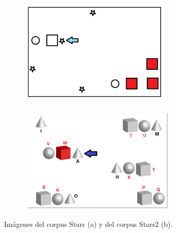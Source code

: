 \begin{figure}[!ht]
\begin{subfigure}{.5\textwidth}

\centering
\includegraphics[width=\textwidth]{images/STARS.png}\\[0pt]
\caption{}
\label{fig-STARS}
\end{subfigure}
\hspace*{0cm}
\begin{subfigure}{.5\textwidth}

\centering
\includegraphics[width=\textwidth]{images/STARS2.png}\\[0pt]
\caption{}
\label{fig-STARS2}
\end{subfigure}
\caption{Im\'agenes del corpus Stars (a) y del corpus Stars2 (b).}\label{imagenes-stars-stars2}
\end{figure}


